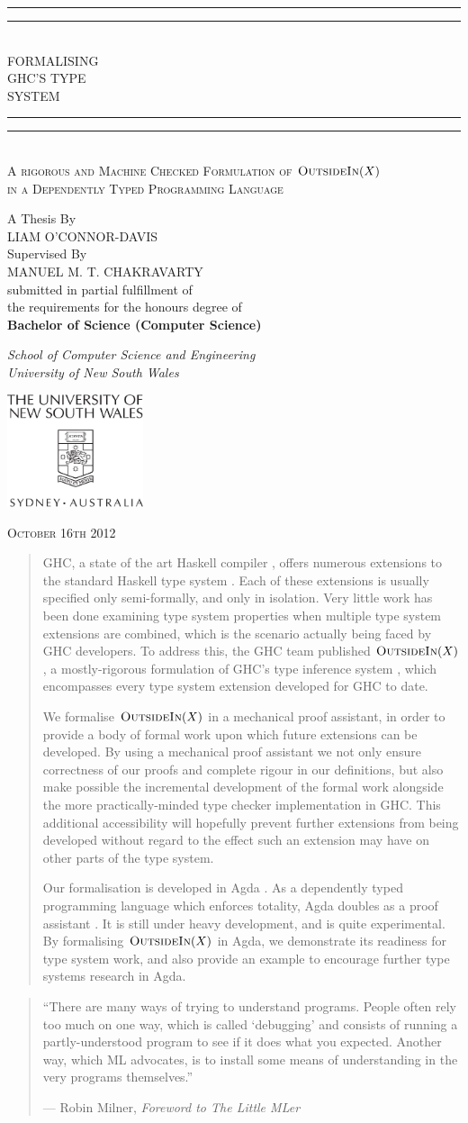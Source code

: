 \documentclass[a4paper]{jfp}
\newlength{\tpheight}\setlength{\tpheight}{0.9\textheight}
\newlength{\txtheight}\setlength{\txtheight}{0.9\tpheight}
\newlength{\tpwidth}\setlength{\tpwidth}{0.9\textwidth}
\newlength{\txtwidth}\setlength{\txtwidth}{0.9\tpwidth}
\newlength{\drop}
\newcommand{\outsidein}{\textsc{OutsideIn}(X)}
\newcommand*{\titleGP}{\begingroup%

\drop=0.1\txtheight
\centering
\vspace*{\baselineskip}
\rule{\txtwidth}{1.6pt}\vspace*{-\baselineskip}\vspace*{2pt}
\rule{\txtwidth}{0.4pt}\\[\baselineskip]
{\LARGE FORMALISING\\ GHC'S TYPE \\[0.3\baselineskip] SYSTEM}\\[0.2\baselineskip]
\rule{\txtwidth}{0.4pt}\vspace*{-\baselineskip}\vspace{3.2pt}
\rule{\txtwidth}{1.6pt}\\[\baselineskip]
\scshape
A rigorous and Machine Checked Formulation of $\textsc{OutsideIn}(X)$ \\
in a Dependently Typed Programming Language\\
\par
\vspace*{2\baselineskip}
A Thesis By \\[\baselineskip]
{\Large LIAM O'CONNOR-DAVIS}
 \\[\baselineskip]
Supervised By \\[\baselineskip]
{\Large MANUEL M. T. CHAKRAVARTY}
 \\[\baselineskip]
 submitted in partial fulfillment of \\ the requirements for the honours degree of \\
 \textbf{Bachelor of Science (Computer Science)}
 \\[\baselineskip]
{\itshape School of Computer Science and Engineering \\ University of New South Wales \par}
\vfill
\includegraphics[width=4cm]{unswcrest.pdf} \\

\medskip

{\scshape October 16th 2012} \\
\par
\endgroup}
\begin{document}
\setlength{\parskip}{9pt plus 1pt minus 1pt}
\pagestyle{empty}
\titleGP
\clearpage
\pagestyle{plain}
\begin{abstract}

GHC, a state of the art Haskell compiler \cite{Anonymous:2010we}, offers numerous extensions to the standard Haskell type system \cite{Schrijvers:2009jg,
   Yorgey:2012:GHP:2103786.2103795, citeulike:9320233, Jones:2007dr}.  Each of these extensions is usually specified only semi-formally, and only in
isolation. Very little work has been done examining type system properties when multiple type system extensions are combined, which is the scenario
actually being faced by GHC developers. To address this, the GHC team published $\outsidein$, a mostly-rigorous formulation of GHC's type inference
system \cite{Vytiniotis:2011:OMT:2139531.2139533}, which encompasses every type system extension developed for GHC to date. 

We formalise $\outsidein$ in a mechanical proof assistant, in order to provide a body of formal work upon which future extensions can be developed. By
using a mechanical proof assistant we not only ensure correctness of our proofs and complete rigour in our definitions, but also make possible the
incremental development of the formal work alongside the more practically-minded type checker implementation in GHC\@. This additional accessibility
will hopefully prevent further extensions from being developed without regard to the effect such an extension may have on other parts of the type
system.

Our formalisation is developed in Agda \cite{conf/afp/norell08}. As a dependently typed programming language which enforces totality, Agda doubles as
a proof assistant \cite{Howard:1980vs}. It is still under heavy development, and is quite experimental. By formalising $\outsidein$ in Agda, we
demonstrate its readiness for type system work, and also provide an example to encourage further type systems research in Agda.

\end{abstract}

\tableofcontents
\newpage
             \vspace*{\fill}
\begin{quote}
\large
``There are many ways of trying to understand programs. People often rely too much on one way, which is called `debugging' and consists of running a
partly-understood program to see if it does what you expected. Another way, which ML advocates, is to install some means of understanding in the very
programs themselves.''
\begin{flushright}
   --- Robin Milner, \emph{Foreword to The Little MLer}
\end{flushright}
\normalsize
\end{quote}
\end{document}
